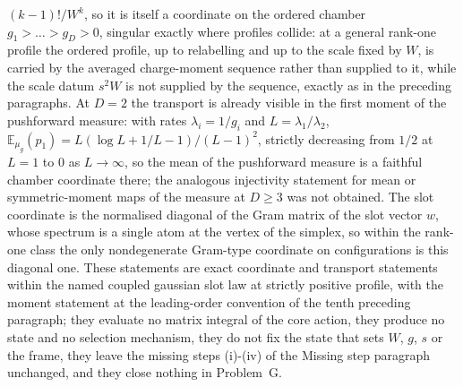 \((k-1)!/W^{k}\), so it is itself a coordinate on the ordered chamber \(g_{1}>\dots>g_{D}>0\), singular exactly where profiles collide: at a general rank-one profile the ordered profile, up to relabelling and up to the scale fixed by \(W\), is carried by the averaged charge-moment sequence rather than supplied to it, while the scale datum \(s^{2}W\) is not supplied by the sequence, exactly as in the preceding paragraphs. At \(D=2\) the transport is already visible in the first moment of the pushforward measure: with rates \(\lambda_{i}=1/g_{i}\) and \(L=\lambda_{1}/\lambda_{2}\), \(\mathbb{E}_{\mu_{g}}(p_{1})=L(\log L+1/L-1)/(L-1)^{2}\), strictly decreasing from \(1/2\) at \(L=1\) to \(0\) as \(L\to\infty\), so the mean of the pushforward measure is a faithful chamber coordinate there; the analogous injectivity statement for mean or symmetric-moment maps of the measure at \(D\ge3\) was not obtained. The slot coordinate is the normalised diagonal of the Gram matrix of the slot vector \(w\), whose spectrum is a single atom at the vertex of the simplex, so within the rank-one class the only nondegenerate Gram-type coordinate on configurations is this diagonal one. These statements are exact coordinate and transport statements within the named coupled gaussian slot law at strictly positive profile, with the moment statement at the leading-order convention of the tenth preceding paragraph; they evaluate no matrix integral of the core action, they produce no state and no selection mechanism, they do not fix the state that sets \(W\), \(g\), \(s\) or the frame, they leave the missing steps (i)-(iv) of the Missing step paragraph unchanged, and they close nothing in Problem~G.

